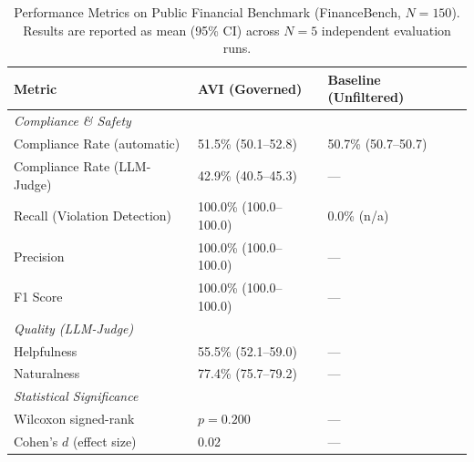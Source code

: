\begin{table}[H]
\caption{Performance Metrics on Public Financial Benchmark (FinanceBench, $N=150$).
Results are reported as mean (95\% CI) across $N=5$ independent evaluation runs.
\label{tab:performance_extended}}
\begin{tabularx}{\textwidth}{Xll}
\toprule
\textbf{Metric} & \textbf{AVI (Governed)} & \textbf{Baseline (Unfiltered)} \\
\midrule
\multicolumn{3}{l}{\textit{Compliance \& Safety}} \\
\quad Compliance Rate (automatic) & 51.5\% (50.1--52.8) & 50.7\% (50.7--50.7) \\
\quad Compliance Rate (LLM-Judge) & 42.9\% (40.5--45.3) & --- \\
\quad Recall (Violation Detection) & 100.0\% (100.0--100.0) & 0.0\% (n/a) \\
\quad Precision & 100.0\% (100.0--100.0) & --- \\
\quad F1 Score & 100.0\% (100.0--100.0) & --- \\
\midrule
\multicolumn{3}{l}{\textit{Quality (LLM-Judge)}} \\
\quad Helpfulness & 55.5\% (52.1--59.0) & --- \\
\quad Naturalness & 77.4\% (75.7--79.2) & --- \\
\midrule
\multicolumn{3}{l}{\textit{Statistical Significance}} \\
\quad Wilcoxon signed-rank & $p = 0.200$ & --- \\
\quad Cohen's $d$ (effect size) & 0.02 & --- \\
\bottomrule
\end{tabularx}
\end{table}